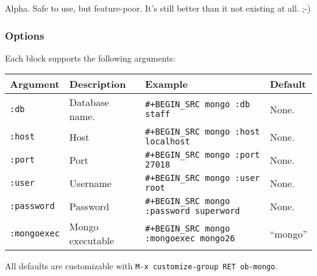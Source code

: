 \documentclass[11pt]{article}
\begin{document}
Alpha. Safe to use, but feature-poor. It's still better than it not existing at all. ;-)

\subsubsection{Options}
\label{sec:org15284f9}

Each block supports the following arguments:

\begin{center}
\begin{tabular}{llll}
Argument & Description & Example & Default\\
\hline
\texttt{:db} & Database name. & \texttt{\#+BEGIN\_SRC mongo :db staff} & None.\\
\texttt{:host} & Host & \texttt{\#+BEGIN\_SRC mongo :host localhost} & None.\\
\texttt{:port} & Port & \texttt{\#+BEGIN\_SRC mongo :port 27018} & None.\\
\texttt{:user} & Username & \texttt{\#+BEGIN\_SRC mongo :user root} & None.\\
\texttt{:password} & Password & \texttt{\#+BEGIN\_SRC mongo :password superword} & None.\\
\texttt{:mongoexec} & Mongo executable & \texttt{\#+BEGIN\_SRC mongo :mongoexec mongo26} & ``mongo''\\
\end{tabular}
\end{center}

All defaults are customizable with \texttt{M-x customize-group RET ob-mongo}.
\end{document}
